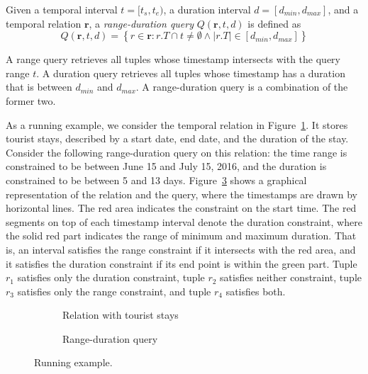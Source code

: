 \documentclass[sigconf,nonacm,anonymous]{acmart}
\theoremstyle{definition}
\newcommand{\R}{\ensuremath{\mathbf{r}}\xspace} %
\newcommand{\T}{\ensuremath{t}} %
\newcommand{\D}{\ensuremath{d}} %
\newcommand{\TS}{\ensuremath{t_s}}
\newcommand{\TE}{\ensuremath{t_e}}
\newcommand{\dmin}{\ensuremath{d_{min}}}
\newcommand{\dmax}{\ensuremath{d_{max}}}
\newcommand{\rT}{\ensuremath{r.T}}
\begin{document}
\begin{definition}
  Given a temporal interval $\T = [\TS, \TE)$, a duration interval
  $\D = [\dmin, \dmax]$, and a temporal relation $\R$, a
  \emph{range-duration query} $Q(\R, \T, \D)$ is defined as
  \[
    Q(\R, \T, \D) = \left\{r \in \R : \rT \cap \T \ne \emptyset \wedge
      |\rT| \in [\dmin, \dmax] \right\}
	\]
\end{definition}

A range query retrieves all tuples whose timestamp intersects with the
query range $\T$.  A duration query retrieves all tuples whose
timestamp has a duration that is between $d_{min}$ and $d_{max}$. A
range-duration query is a combination of the former two.

\begin{example}\label{example:queries}
  As a running example, we consider the temporal relation in
  Figure~\ref{tab:example}. It stores tourist stays, described by a
  start date, end date, and the duration of the stay.
  Consider the following range-duration query on this relation: the
  time range is constrained to be between June 15 and July 15, 2016,
  and the duration is constrained to be between 5 and 13 days.
  Figure~\ref{fig:example-intervals} shows a graphical representation
  of the relation and the query, where the timestamps are drawn by
  horizontal lines.  The red area indicates the constraint on the
  start time.  The red segments on top of each timestamp interval
  denote the duration constraint, where the solid red part indicates
  the range of minimum and maximum duration.  That is, an interval
  satisfies the range constraint if it intersects with the red area,
  and it satisfies the duration constraint if its end point is within
  the green part.
  Tuple $r_1$ satisfies only the duration constraint, tuple $r_2$ satisfies neither constraint, tuple $r_3$ satisfies only the range constraint, and tuple $r_4$ satisfies both.
\end{example}

\begin{figure}
  \begin{subfigure}{\columnwidth}
    \centering
    
    \caption{Relation with tourist stays\label{tab:example}}
  \end{subfigure}

  \medskip
  \begin{subfigure}{\columnwidth}
    \centering
    
    \caption{Range-duration query\label{fig:example-intervals}}
  \end{subfigure}
  \caption{Running example.}
\end{figure}
\end{document}
